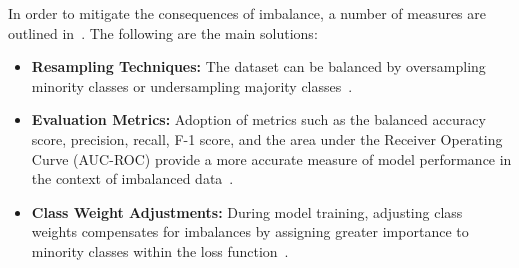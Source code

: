 In order to mitigate the consequences of imbalance, a number of measures are outlined in~\citep{Survey_DL_Taghi_article}. The following are the main solutions:
\begin{itemize}
    \item \textbf{Resampling Techniques:} The dataset can be balanced by oversampling minority classes or undersampling majority classes~\citep{5128907Haibo_Imbalance,Survey_DL_Taghi_article}.
    \item \textbf{Evaluation Metrics:} Adoption of metrics such as the balanced accuracy score, precision, recall, F-1 score, and the area under the Receiver Operating Curve (AUC-ROC) provide a more accurate measure of model performance in the context of imbalanced data~\citep{Survey_DL_Taghi_article, 18_wang2016training}.
    \item \textbf{Class Weight Adjustments:} During model training, adjusting class weights compensates for imbalances by assigning greater importance to minority classes within the loss function~\citep{Survey_DL_Taghi_article}.
\end{itemize}


